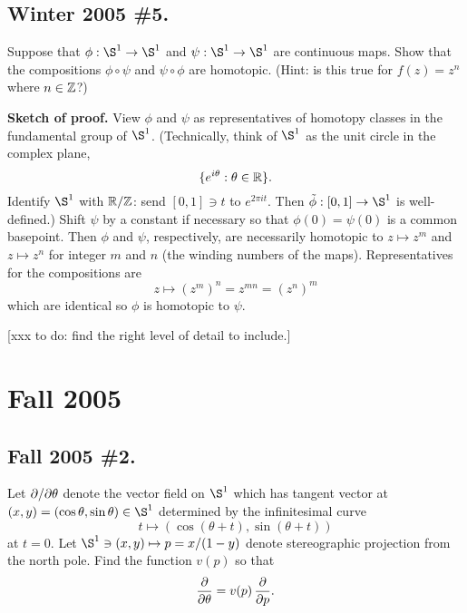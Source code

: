 \documentclass[10pt]{article}
\numberwithin{equation}{subsection}
\begin{document}
\subsection{Winter 2005 \#5.}

Suppose that $\phi:\S^1 \to \S^1$ and $\psi:\S^1 \to \S^1$ are continuous maps.
Show that the compositions $\phi\circ\psi$ and $\psi\circ\phi$ are homotopic.
(Hint:  is this true for $f(z) = z^n$ where $n \in \mathbb{Z}$?)

\textbf{Sketch of proof.}  View $\phi$ and $\psi$ as representatives of
homotopy classes in the fundamental group of $\S^1$.  (Technically, think of
$\S^1$ as the unit circle in the complex plane, $$\{e^{i\theta}: \theta \in
\mathbb{R}\}.$$ Identify $\S^1$ with $\mathbb{R}/\mathbb{Z}$:  send $[0,1] \ni t$ to $e^{2\pi i t}$.
Then $\tilde\phi: [0,1] \to \S^1$ is well-defined.) Shift $\psi$ by a constant
if necessary so that $\phi(0)=\psi(0)$ is a common basepoint.  Then $\phi$ and
$\psi$, respectively, are necessarily homotopic to $z \mapsto z^m$ and $z
\mapsto z^n$ for integer $m$ and $n$ (the winding numbers of the maps).
Representatives for the compositions are
$$
	z \mapsto (z^m)^n = z^{mn} = (z^n)^m
$$
which are identical so $\phi$ is homotopic to $\psi$.

[xxx to do:  find the right level of detail to include.]

\newpage
\section{Fall 2005}

\subsection{Fall 2005 \#2.}

Let $\partial/\partial \theta$ denote the vector field on $\S^1$ which has tangent
vector at $(x,y) = (\cos\theta, \sin\theta) \in \S^1$ determined by the
infinitesimal curve
$$
	t \mapsto (\cos(\theta+t), \sin(\theta+t))
$$
at $t=0$.  Let $\S^1 \ni (x,y) \mapsto p = x/(1-y)$ denote stereographic
projection from the north pole.  Find the function $v(p)$ so that
$$
	\frac{\partial}{\partial \theta} = v(p) \,\frac{\partial}{\partial p}.
$$
\end{document}

